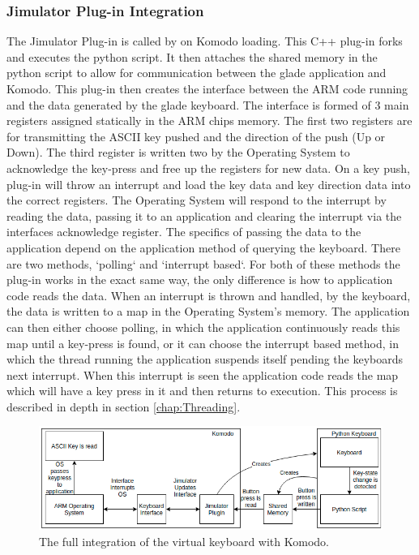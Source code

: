 \subsubsection{Jimulator Plug-in Integration}
The Jimulator Plug-in is called by on Komodo loading. This C++ plug-in \cite{cbook} forks and executes the python script. It then attaches the shared memory in the python script to allow for communication between the glade application and Komodo. This plug-in then creates the interface between the ARM code running and the data generated by the glade keyboard. The interface is formed of 3 main registers assigned statically in the ARM chips memory. The first two registers are for transmitting the ASCII key pushed and the direction of the push (Up or Down). The third register is written two by the Operating System to acknowledge the key-press and free up the registers for new data. On a key push, plug-in will throw an interrupt and load the key data and key direction data into the correct registers. The Operating System will respond to the interrupt by reading the data, passing it to an application and clearing the interrupt via the interfaces acknowledge register. The specifics of passing the data to the application depend on the application method of querying the keyboard. There are two methods, `polling` and `interrupt based`. For both of these methods the plug-in works in the exact same way, the only difference is how to application code reads the data. When an interrupt is thrown and handled, by the keyboard, the data is written to a map in the Operating System's memory. The application can then either choose polling, in which the application continuously reads this map until a key-press is found, or it can choose the interrupt based method, in which the thread running the application suspends itself pending the keyboards next interrupt. When this interrupt is seen the application code reads the map which will have a key press in it and then returns to execution. This process is described in depth in section \ref{chap:Threading}.
\begin{figure}[ht!]
	\includegraphics[width=\linewidth]{figures/jimulator.png}
	\caption{The full integration of the virtual keyboard with Komodo.}
	\label{fig:keyboard_integration}
\end{figure} 

